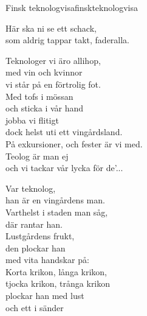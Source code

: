 \begin{song}{Finsk teknologvisa}{finskteknologvisa}
\begin{vers}
Här ska ni se ett schack,\\
som aldrig tappar takt, faderalla.
\end{vers}
\begin{vers}
Teknologer vi äro allihop,\\
med vin och kvinnor\\%
vi står på en förtrolig fot.\\
Med tofs i mössan\\
och sticka i vår hand\\
jobba vi flitigt\\
dock helst uti ett vingårdsland.\\
På exkursioner, och fester är vi med.\\
Teolog är man ej\\
och vi tackar vår lycka för de'...\\
\end{vers}
\begin{vers}
\repopen Var teknolog,\\
han är en vingårdens man.\\ %
Varthelst i staden man såg,\\
där rantar han.\\ %
Lustgårdens frukt,\\
den plockar han\\ %
med vita handskar på:\\
Korta krikon, långa krikon,\\ %
tjocka krikon, trånga krikon\\ %
plockar han med lust\\ %
och ett i sänder \repclose\\
\end{vers}
\end{song}
